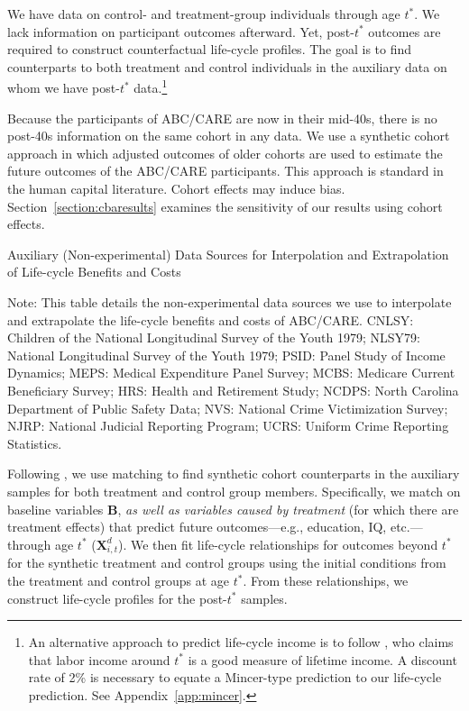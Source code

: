 We have data on control- and treatment-group individuals through age $t^{\ast}$. We lack information on participant outcomes afterward. Yet, post-$t^{\ast}$ outcomes are required to construct counterfactual life-cycle profiles. The goal is to find counterparts to both treatment and control individuals in the auxiliary data on whom we have post-$t^{\ast}$ data.\footnote{An alternative approach to predict life-cycle income is to follow \citet{Mincer_1974_schooling}, who claims that labor income around $t^*$ is a good measure of lifetime income. A discount rate of 2\% is necessary to equate a Mincer-type prediction to our life-cycle prediction. See Appendix~\ref{app:mincer}.}

Because the participants of ABC/CARE are now in their mid-40s, there is no post-40s information on the same cohort  in any data. We use a synthetic cohort approach in which adjusted outcomes of older cohorts are used to estimate the future outcomes of the ABC/CARE participants. This approach is standard in the human capital literature. Cohort effects may induce bias. Section~\ref{section:cbaresults} examines the sensitivity of our results using cohort effects.

\begin{table}[!htbp]
\begin{threeparttable}
\caption{Auxiliary (Non-experimental) Data Sources for Interpolation and Extrapolation of Life-cycle Benefits and Costs} \label{table:sources}
\footnotesize

\begin{tablenotes}
\footnotesize
Note: This table details the non-experimental data sources we use to interpolate and extrapolate the life-cycle benefits and costs of ABC/CARE. CNLSY: Children of the National Longitudinal Survey of the Youth 1979; NLSY79: National Longitudinal Survey of the Youth 1979; PSID: Panel Study of Income Dynamics; MEPS: Medical Expenditure Panel Survey; MCBS: Medicare Current Beneficiary Survey; HRS: Health and Retirement Study; NCDPS: North Carolina Department of Public Safety Data; NVS: National Crime Victimization Survey; NJRP: National Judicial Reporting Program; UCRS: Uniform Crime Reporting Statistics.
\end{tablenotes}
\end{threeparttable}
\end{table}

Following \citet{Heckman_Ichimura_etal_1998_REStud}, we use matching to find synthetic cohort counterparts in the auxiliary samples for both treatment and control group members. Specifically, we match on baseline variables $\bm{B}$, \textit{as well as variables caused by treatment} (for which there are treatment effects) that predict future outcomes---e.g., education, IQ, etc.---through age $t^{\ast}$ ($\bm{X}^{d}_{i,t}$). We then fit life-cycle relationships for outcomes beyond $t^{\ast}$ for the synthetic treatment and control groups using the initial conditions from the treatment and control groups at age $t^{\ast}$. From these relationships, we construct life-cycle profiles for the post-$t^*$ samples.

